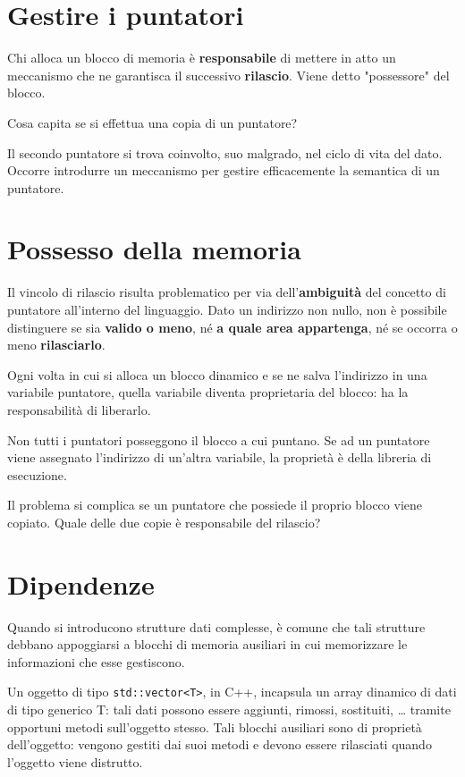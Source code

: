\section{Gestire i puntatori  }

Chi alloca un blocco di memoria è \textbf{responsabile} di mettere in atto un meccanismo
che ne garantisca il successivo \textbf{rilascio}. Viene detto "possessore" del blocco.

Cosa capita se si effettua una copia di un puntatore?

Il secondo puntatore si trova coinvolto, suo malgrado, nel ciclo di vita del dato. Occorre introdurre un meccanismo per gestire efficacemente la semantica di un puntatore.


\section{Possesso della memoria  }

Il vincolo di rilascio risulta problematico per via dell'\textbf{ambiguità} del concetto di
puntatore all'interno del linguaggio. Dato un indirizzo non nullo, non è possibile distinguere se sia \textbf{valido o meno}, né \textbf{a quale area appartenga}, né se occorra o meno \textbf{rilasciarlo}.\newline

Ogni volta in cui si alloca un blocco dinamico e se ne salva l'indirizzo in una variabile
puntatore, quella variabile diventa proprietaria del blocco: ha la responsabilità di liberarlo.

Non tutti i puntatori posseggono il blocco a cui puntano. Se ad un puntatore viene assegnato l'indirizzo di un'altra variabile, la proprietà è della libreria di esecuzione.

Il problema si complica se un puntatore che possiede il proprio blocco viene copiato. Quale delle due copie è responsabile del rilascio?




\section{Dipendenze }


Quando si introducono strutture dati complesse, è comune che tali strutture
debbano appoggiarsi a blocchi di memoria ausiliari in cui memorizzare le
informazioni che esse gestiscono.

Un oggetto di tipo \texttt{std::vector<T>}, in C++, incapsula un array dinamico di dati di tipo generico T:
tali dati possono essere aggiunti, rimossi, sostituiti, … tramite opportuni metodi sull'oggetto stesso. Tali blocchi ausiliari sono di proprietà dell'oggetto: vengono gestiti dai suoi metodi e devono essere
rilasciati quando l'oggetto viene distrutto.

